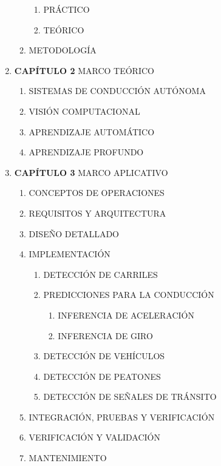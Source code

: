 \begin{enumerate}[nosep, label*=\arabic*.]
\begin{enumerate}[nosep, label*=\arabic*.]
\begin{enumerate}[nosep, label*=\arabic*.]
            \item PRÁCTICO
            \item TEÓRICO
        \end{enumerate}
        \item METODOLOGÍA
    \end{enumerate}
    \item \textbf{CAPÍTULO 2} MARCO TEÓRICO
    \begin{enumerate}[nosep, label*=\arabic*.]
        \item SISTEMAS DE CONDUCCIÓN AUTÓNOMA
        \item VISIÓN COMPUTACIONAL
        \item APRENDIZAJE AUTOMÁTICO
        \item APRENDIZAJE PROFUNDO
    \end{enumerate}
    \item \textbf{CAPÍTULO 3} MARCO APLICATIVO
    \begin{enumerate}[nosep, label*=\arabic*.]
        \item \MakeUppercase{Conceptos de operaciones}
        \item \MakeUppercase{Requisitos y arquitectura}
        \item \MakeUppercase{Diseño detallado}
        \item \MakeUppercase{implementación}
        \begin{enumerate}[nosep, label*=\arabic*.]
            \item DETECCIÓN DE CARRILES
            \item PREDICCIONES PARA LA CONDUCCIÓN
            \begin{enumerate}[nosep, label*=\arabic*.]
                \item INFERENCIA DE ACELERACIÓN
                \item INFERENCIA DE GIRO
            \end{enumerate}
            \item DETECCIÓN DE VEHÍCULOS
            \item DETECCIÓN DE PEATONES
            \item DETECCIÓN DE SEÑALES DE TRÁNSITO
        \end{enumerate}
        \item \MakeUppercase{Integración, pruebas y verificación}
        \item \MakeUppercase{Verificación y validación}
        \item \MakeUppercase{Mantenimiento}
    \end{enumerate}

\end{enumerate}
